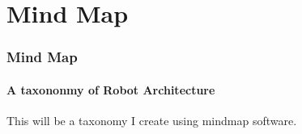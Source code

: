 \section{Mind Map}

\begin{frame}
    \frametitle{Mind Map}
    \framesubtitle{A taxononmy of Robot Architecture}
    This will be a taxonomy I create using mindmap software.
\end{frame}